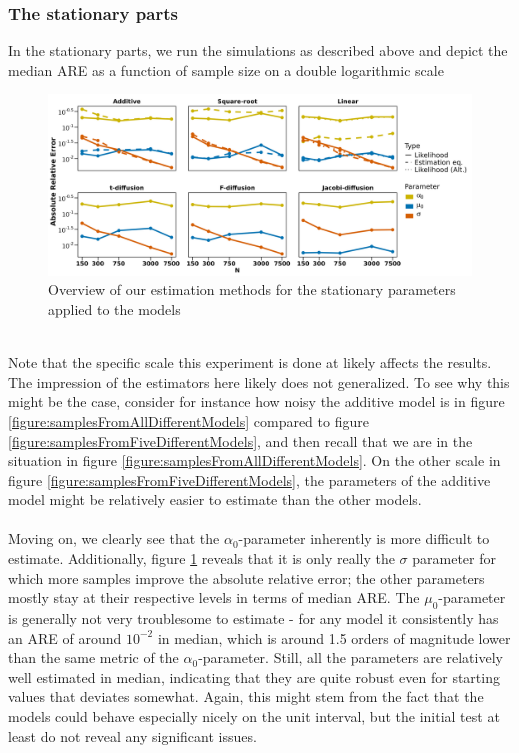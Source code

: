 \subsubsection{The stationary parts}
In the stationary parts, we run the simulations as described above and depict the median ARE as a function of sample size on a double logarithmic scale
\begin{figure}[h]
    \begin{center}
    \includegraphics[scale = .1]{figures/parameter_precision_stationary.jpeg}
    \caption{Overview of our estimation methods for the stationary parameters applied to the models}
    \label{figure:overviewOfEstimatorsStationary}
    \end{center}
\end{figure}\\
Note that the specific scale this experiment is done at likely affects the results. The impression of the estimators here likely does not generalized. To see why this might be the case, consider for instance how noisy the additive model is in figure \ref{figure:samplesFromAllDifferentModels} compared to figure \ref{figure:samplesFromFiveDifferentModels}, and then recall that we are in the situation in figure \ref{figure:samplesFromAllDifferentModels}. On the other scale in figure \ref{figure:samplesFromFiveDifferentModels}, the parameters of the additive model might be relatively easier to estimate than the other models.\\\\
Moving on, we clearly see that the $\alpha_0$-parameter inherently is more difficult to estimate. Additionally, figure \ref{figure:overviewOfEstimatorsStationary} reveals that it is only really the $\sigma$ parameter for which more samples improve the absolute relative error; the other parameters mostly stay at their respective levels in terms of median ARE. The $\mu_0$-parameter is generally not very troublesome to estimate - for any model it consistently has an ARE of around $10^{-2}$ in median, which is around 1.5 orders of magnitude lower than the same metric of the $\alpha_0$-parameter. Still, all the parameters are relatively well estimated in median, indicating that they are quite robust even for starting values that deviates somewhat. Again, this might stem from the fact that the models could behave especially nicely on the unit interval, but the initial test at least do not reveal any significant issues.


